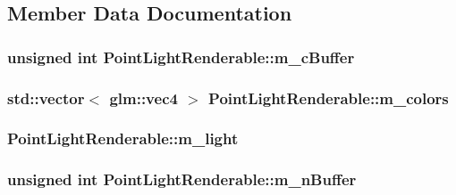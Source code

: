 \subsection{Member Data Documentation}
\hypertarget{classPointLightRenderable_ab2f20160f2e541d4822ef4120c70dfc3}{
\subsubsection[{m\+\_\+c\+Buffer}]{\setlength{\rightskip}{0pt plus 5cm}unsigned int Point\+Light\+Renderable\+::m\+\_\+c\+Buffer\hspace{0.3cm}{\ttfamily [private]}}}\label{classPointLightRenderable_ab2f20160f2e541d4822ef4120c70dfc3}
\hypertarget{classPointLightRenderable_a6d45d8ebfe800a578f22a6cfa0b7981c}{
\subsubsection[{m\+\_\+colors}]{\setlength{\rightskip}{0pt plus 5cm}std\+::vector$<$ glm\+::vec4 $>$ Point\+Light\+Renderable\+::m\+\_\+colors\hspace{0.3cm}{\ttfamily [private]}}}\label{classPointLightRenderable_a6d45d8ebfe800a578f22a6cfa0b7981c}
\hypertarget{classPointLightRenderable_a937b4cab5b786b27414374505769d1ce}{
\subsubsection[{m\+\_\+light}]{ Point\+Light\+Renderable\+::m\+\_\+light\hspace{0.3cm}{\ttfamily [private]}}}\label{classPointLightRenderable_a937b4cab5b786b27414374505769d1ce}
\hypertarget{classPointLightRenderable_af8c0b76df5c6f9470ffec65afea21b83}{
\subsubsection[{m\+\_\+n\+Buffer}]{\setlength{\rightskip}{0pt plus 5cm}unsigned int Point\+Light\+Renderable\+::m\+\_\+n\+Buffer\hspace{0.3cm}{\ttfamily [private]}}}\label{classPointLightRenderable_af8c0b76df5c6f9470ffec65afea21b83}
